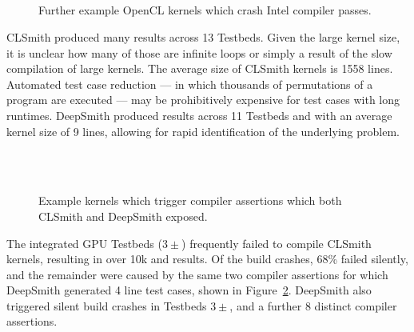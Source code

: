 
\begin{figure}
  \centering
  \\%
  \\%
  \\%
  \\%
  \caption[Further example kernels which crash Intel compiler passes]{%
    Further example OpenCL kernels which crash Intel compiler passes.%
  }%
  \label{lst:further-intel-passes}
\end{figure}

CLSmith produced many \bto results across 13 Testbeds. Given the large kernel size, it is unclear how many of those are infinite loops or simply a result of the slow compilation of large kernels. The average size of CLSmith \bto kernels is 1558 lines. Automated test case reduction --- in which thousands of permutations of a program are executed --- may be prohibitively expensive for test cases with long runtimes. DeepSmith produced \bto results across 11 Testbeds and with an average kernel size of 9 lines, allowing for rapid identification of the underlying problem.


\begin{figure}
  \centering %
  \\%
  \subfloat[Assertion \emph{iter != pointerOrigMap.end()}.]{%
    \noindent\mbox{\parbox{\columnwidth}{\usebox{\BeigIterAssertion}}}%
    \label{lst:beig-iter-assertion}
  }\\%
  \caption[Kernels which expose errors exposed by CLSmith and DeepSmith]{%
    Example kernels which trigger compiler assertions which both CLSmith and DeepSmith exposed.%
  }%
  \label{lst:common-compiler-assertions}
\end{figure}

The integrated GPU Testbeds ($3\pm$) frequently failed to compile CLSmith kernels, resulting in over 10k \bc and \bto results. Of the build crashes, 68\% failed silently, and the remainder were caused by the same two compiler assertions for which DeepSmith generated 4 line test cases, shown in Figure~\ref{lst:common-compiler-assertions}. DeepSmith also triggered silent build crashes in Testbeds $3\pm$, and a further 8 distinct compiler assertions.

